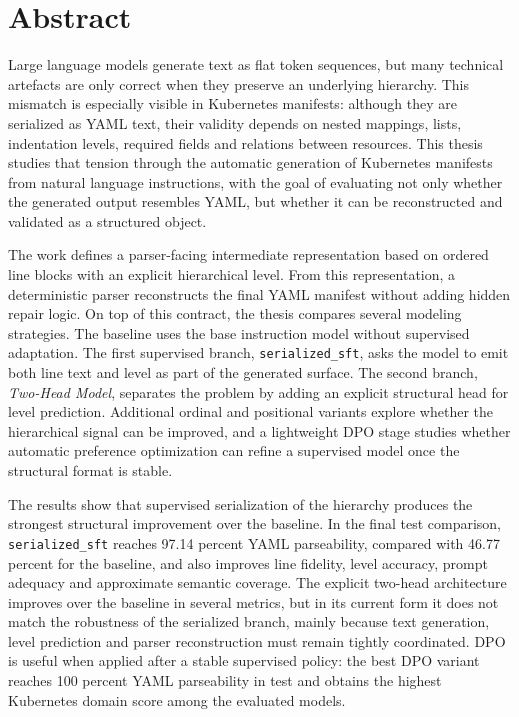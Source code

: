 %

\section*{Abstract}
\label{sec::abstract}

Large language models generate text as flat token sequences, but many technical artefacts are only correct when they preserve an underlying hierarchy. This mismatch is especially visible in Kubernetes manifests: although they are serialized as YAML text, their validity depends on nested mappings, lists, indentation levels, required fields and relations between resources. This thesis studies that tension through the automatic generation of Kubernetes manifests from natural language instructions, with the goal of evaluating not only whether the generated output resembles YAML, but whether it can be reconstructed and validated as a structured object.

The work defines a parser-facing intermediate representation based on ordered line blocks with an explicit hierarchical level. From this representation, a deterministic parser reconstructs the final YAML manifest without adding hidden repair logic. On top of this contract, the thesis compares several modeling strategies. The baseline uses the base instruction model without supervised adaptation. The first supervised branch, \texttt{serialized\_sft}, asks the model to emit both line text and level as part of the generated surface. The second branch, \textit{Two-Head Model}, separates the problem by adding an explicit structural head for level prediction. Additional ordinal and positional variants explore whether the hierarchical signal can be improved, and a lightweight DPO stage studies whether automatic preference optimization can refine a supervised model once the structural format is stable.

The results show that supervised serialization of the hierarchy produces the strongest structural improvement over the baseline. In the final test comparison, \texttt{serialized\_sft} reaches 97.14 percent YAML parseability, compared with 46.77 percent for the baseline, and also improves line fidelity, level accuracy, prompt adequacy and approximate semantic coverage. The explicit two-head architecture improves over the baseline in several metrics, but in its current form it does not match the robustness of the serialized branch, mainly because text generation, level prediction and parser reconstruction must remain tightly coordinated. DPO is useful when applied after a stable supervised policy: the best DPO variant reaches 100 percent YAML parseability in test and obtains the highest Kubernetes domain score among the evaluated models.

